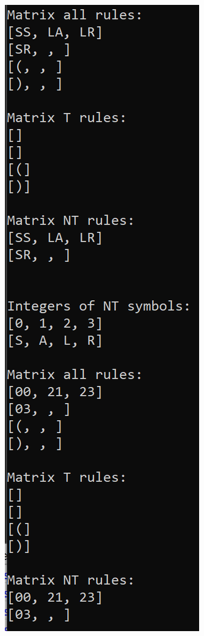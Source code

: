 \documentclass[a4paper, 11pt]{article}
\begin{document}
\begin{minipage}{0.6\textwidth}
\end{minipage}\begin{minipage}{0.1\textwidth}
\ 
\end{minipage}\begin{minipage}{0.3\textwidth}
\includegraphics[scale=0.6]{images/terminal_1.png}
\end{minipage}
\end{document}
